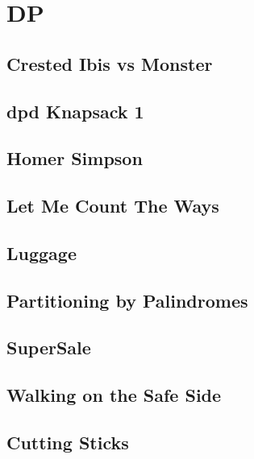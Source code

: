 \section{DP}
        \subsection{Crested Ibis vs Monster}
                
        \subsection{dpd Knapsack 1}
                
        \subsection{Homer Simpson}
                
        \subsection{Let Me Count The Ways}
                
        \subsection{Luggage}
                
        \subsection{Partitioning by Palindromes}
                
        \subsection{SuperSale}
                
        \subsection{Walking on the Safe Side}
                
        \subsection{Cutting Sticks}
                
